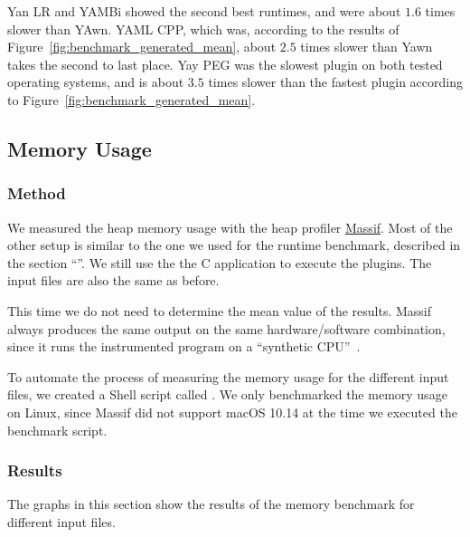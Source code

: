 Yan LR and YAMBi showed the second best runtimes, and were about $1.6$ times slower than YAwn. YAML CPP, which was, according to the results of Figure~\ref{fig:benchmark_generated_mean}, about $2.5$ times slower than Yawn takes the second to last place. Yay PEG was the slowest plugin on both tested operating systems, and is about $3.5$ times slower than the fastest plugin according to Figure~\ref{fig:benchmark_generated_mean}.

\subsection{Memory Usage}
\label{sec:memory_usage}

\subsubsection{Method}

\newcommand{\FileBenchmarkMemory}{{%
\href{http://rawdata.libelektra.org/tree/master/YAML/Scripts/benchmark-memory}%
{\sh{benchmark-memory}}%
}}

We measured the heap memory usage with the heap profiler \href{http://valgrind.org/docs/manual/ms-manual.html}{Massif}. Most of the other setup is similar to the one we used for the runtime benchmark, described in the section “”. We still use the the C application \FilePluginGetSet{} to execute the plugins. The input files are also the same as before.

This time we do not need to determine the mean value of the results. Massif always produces the same output on the same hardware/software combination, since it runs the instrumented program \FilePluginGetSet{} on a “synthetic CPU”~\cite{valgrind2019core}.

To automate the process of measuring the memory usage for the different input files, we created a Shell script called \FileBenchmarkMemory{}. We only benchmarked the memory usage on Linux, since Massif did not support macOS 10.14 at the time we executed the benchmark script.

\subsubsection{Results}

The graphs in this section show the results of the memory benchmark for different input files.

